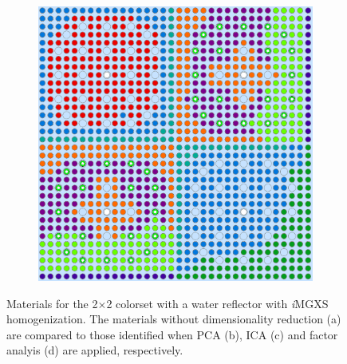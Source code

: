 \begin{appendices}
\begin{figure}[h!]
\begin{subfigure}{0.48\textwidth}
  \caption{}
  \label{fig:refl-combined-ica-2}
\end{subfigure}%
\begin{subfigure}{0.48\textwidth}
  \centering
  \includegraphics[width=0.95\linewidth]{figures/unsupervised/geometries/dimension-reduce/reflector/factor-analysis}
  \caption{}
  \label{fig:refl-combined-factor-analysis-2}
\end{subfigure}
\caption[Clustered geometries with dimensionality reduction]{Materials for the 2$\times$2 colorset with a water reflector with \textit{i}\ac{MGXS} homogenization. The materials without dimensionality reduction (a) are compared to those identified when PCA (b), ICA (c) and factor analyis (d) are applied, respectively.}
\label{fig:dimension-reduce-refl-geometries}
\end{figure}

\clearpage

\end{appendices}
